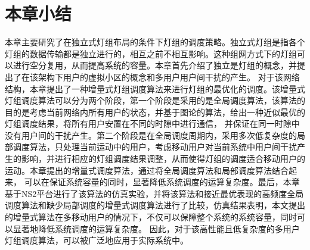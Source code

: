 \section{本章小结}
本章主要研究了在独立式灯组布局的条件下灯组的调度策略。独立式灯组是指各个灯组的数据传输都是独立进行的，相互之前不相互影响。这种组网方式下的灯组可以进行空分复用，从而提高系统的容量。本章首先介绍了独立是灯组的概念，并提出了在该架构下用户的虚拟小区的概念和多用户用户间干扰的产生。
对于该网络结构，本章提出了一种增量式灯组调度算法来进行灯组的最优化的调度。该增量式灯组调度算法可以分为两个阶段，第一个阶段是采用的是全局调度算法，该算法的目的是考虑当前网络内所有用户的状态，并基于图论的算法，给出一种近似最优的灯组调度结果，将所有用户安置在不同的时隙中进行通信，
并保证在同一时隙中没有用户间的干扰产生。第二个阶段是在全局调度周期内，采用多次低复杂度的局部调度算法，只处理当前运动中的用户，考虑移动用户对当前系统中用户间干扰产生的影响，并进行相应的灯组调度结果调整，从而使得灯组的调度适合移动用户的运动。本章提出的增量式调度算法，通过将全局调度算法和局部调度算法结合起来，
可以在保证系统容量的同时，显著降低系统调度的运算复杂度。最后，本章基于NS2平台进行了该算法的仿真实验，并将该算法和接近最优表现的高频度全局调度算法和缺少局部调度的增量式调度算法进行了比较，仿真结果表明，本文提出的增量式算法在多移动用户的情况下，不仅可以保障整个系统的系统容量，同时可以显著地降低系统调度的运算复杂度。
因此，对于该高性能且低复杂度的多用户灯组调度算法，可以被广泛地应用于实际系统中。 